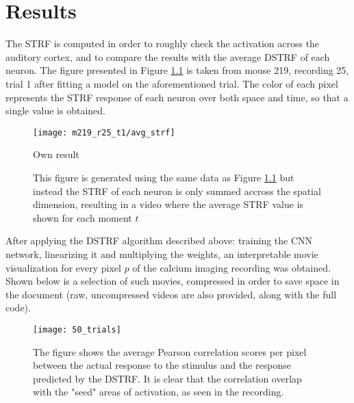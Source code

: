 \chapter{Results}\label{results}

The STRF is computed in order to roughly check the activation across the auditory cortex, and to compare the results with the average DSTRF of each neuron. The figure presented in Figure \ref{fig:strf_m219_r25} is taken from mouse 219, recording 25, trial 1 after fitting a  model on the aforementioned trial. The color of each pixel represents the STRF response of each neuron over both space and time, so that a single value is obtained.

\begin{figure}[ht]
	\centering
	\texttt{[image: m219\_r25\_t1/avg\_strf]}
	\caption{Own result}
	\label{fig:strf_m219_r25}
\end{figure}

\begin{figure}
\centering
{}
\caption{This figure is generated using the same data as Figure \ref{fig:strf_m219_r25} but instead the STRF of each neuron is only summed accross the spatial dimension, resulting in a video where the average STRF value is shown for each moment $t$}
\end{figure}


After applying the DSTRF algorithm described above: training the CNN network, linearizing it and multiplying the weights, an interpretable movie visualization for every pixel $p$ of the calcium imaging recording was obtained. Shown below is a selection of such movies, compressed in order to save space in the document (raw, uncompressed videos are also provided, along with the full code).


\begin{figure}
	\centering
	\texttt{[image: 50\_trials]}
	\caption{The figure shows the average Pearson correlation scores per pixel between the actual response to the stimulus and the response predicted by the DSTRF. It is clear that the correlation overlap with the "seed" areas of activation, as seen in the recording.}
	\label{fig:50trials}
\end{figure}

